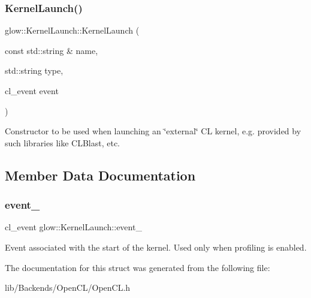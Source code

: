 \subsubsection{\texorpdfstring{Kernel\+Launch()}{KernelLaunch()}}
{\footnotesize\ttfamily glow\+::\+Kernel\+Launch\+::\+Kernel\+Launch (\begin{DoxyParamCaption}\item[{const std\+::string \&}]{name,  }\item[{std\+::string}]{type,  }\item[{cl\+\_\+event}]{event }\end{DoxyParamCaption})\hspace{0.3cm}{\ttfamily [inline]}}

Constructor to be used when launching an \char`\"{}external\char`\"{} CL kernel, e.\+g. provided by such libraries like C\+L\+Blast, etc. 

\subsection{Member Data Documentation}
\mbox{\label{structglow_1_1_kernel_launch_a2f84c430a76b24b6e12a32812a00db8c}} 
\subsubsection{\texorpdfstring{event\+\_\+}{event\_}}
{\footnotesize\ttfamily cl\+\_\+event glow\+::\+Kernel\+Launch\+::event\+\_\+}

Event associated with the start of the kernel. Used only when profiling is enabled. 

The documentation for this struct was generated from the following file\+:\begin{DoxyCompactItemize}
\item 
lib/\+Backends/\+Open\+C\+L/Open\+C\+L.\+h\end{DoxyCompactItemize}

